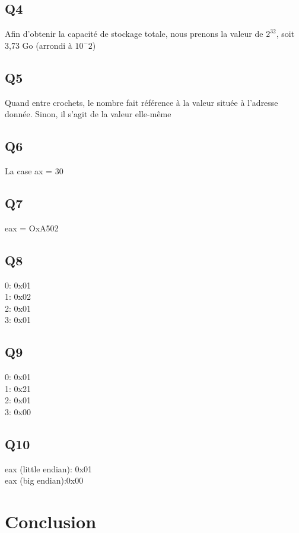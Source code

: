 \documentclass[a4paper]{article}
\begin{document}
\subsection{Q4}
Afin d'obtenir la capacité de stockage totale, nous prenons la valeur de $2^32$, soit\\ %
3,73 Go (arrondi à $10^-2$)

\subsection{Q5}
Quand entre crochets, le nombre fait référence à la valeur située à l'adresse donnée. Sinon, il s'agit de la valeur elle-même

\subsection{Q6}
La case
ax = 30

\subsection{Q7}
eax = OxA502

\subsection{Q8}
0: 0x01\\
1: 0x02\\
2: 0x01\\
3: 0x01\\

\subsection{Q9}
0: 0x01\\
1: 0x21\\
2: 0x01\\
3: 0x00\\

\subsection{Q10}
eax (little endian): 0x01\\
eax (big endian):0x00

\section{Conclusion}
\end{document}
